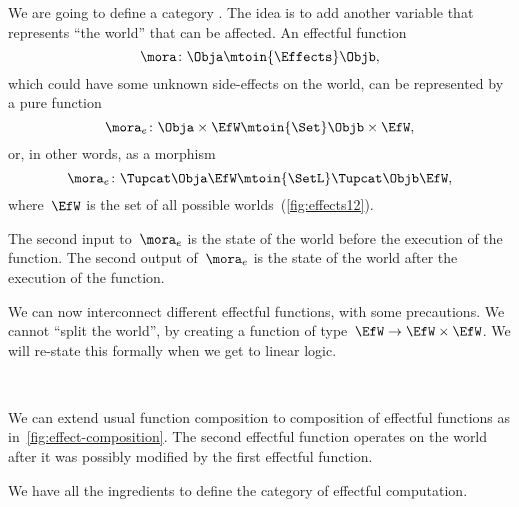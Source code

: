 We are going to define a category \Effects.
The idea is to add another variable that represents ``the world'' that can be affected.
An effectful function
%
\begin{equation}
    \mora\colon \Obja \mtoin{\Effects} \Objb,
\end{equation}
%
which could have some unknown side-effects on the world, can be represented by a pure function
\begin{equation}
    \mora_e\colon  \Obja  \times \EfW \mtoin{\Set}   \Objb \times \EfW,
\end{equation}
or, in other words, as a morphism
\begin{equation}
    \mora_e\colon  \Tupcat \Obja   \EfW \mtoin{\SetL}   \Tupcat  \Objb \EfW,
\end{equation}
%
where~$\EfW$ is the set of all possible worlds~(\cref{fig:effects12}).

The second input to~$\mora_e$ is the state of the world before the execution of the function.
The second output of~$\mora_e$ is the state of the world after the execution of the function.

We can now interconnect different effectful functions, with some precautions.
We cannot ``split the world'', by creating a function of type~$\EfW \to  \EfW \times \EfW$.
We will re-state this formally when we get to linear logic.

\begin{marginfigure}
    \centering
    \\
    \caption{}
    \label{fig:effect-composition}
\end{marginfigure}

We can extend usual function composition to composition of effectful functions as in~\cref{fig:effect-composition}.
The second effectful function operates on the world after it was possibly modified by the first effectful function.

We have all the ingredients to define the category \Effects of effectful computation.

